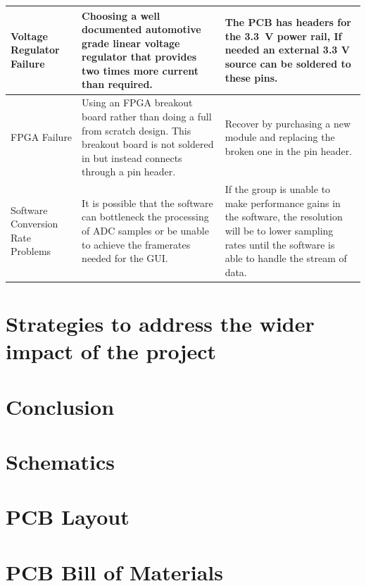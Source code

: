 \documentclass[letterpaper,12pt]{article}
\begin{document}
\begin{table}[h!]
\begin{tabularx}{\textwidth}{p{2in}|p{2in}|p{2in}}
        \hline
        Voltage Regulator Failure

        & Choosing a well documented automotive grade linear voltage regulator
        that provides two times more current than required.

        & The PCB has headers for the \SI{3.3}{\volt} power rail, If needed an
        external 3.3 V source can be soldered to these pins. \\

        \hline
        FPGA Failure

        & Using an FPGA breakout board rather than doing a full from scratch
        design. This breakout board is not soldered in but instead connects
        through a pin header.

        & Recover by purchasing a new module and replacing the broken one in the
        pin header.\\
        
        \hline
        Software Conversion Rate Problems

        & It is possible that the software can bottleneck the processing of ADC
        samples or be unable to achieve the framerates needed for the GUI.

        & If the group is unable to make performance gains in the software, the
        resolution will be to lower sampling rates until the software is able to
        handle the stream of data.
    \end{tabularx}
\label{tab:issue-mitigation}
\end{table}

\section{Strategies to address the wider impact of the project}
\section{Conclusion}
\newpage


\newpage

\begin{appendices}
    \section{Schematics}
    \label{appendix:schematic}
    \section{PCB Layout}
    \label{appendix:layout}
    \section{PCB Bill of Materials}
    \label{appendix:bom}
\end{appendices}
\end{document}
